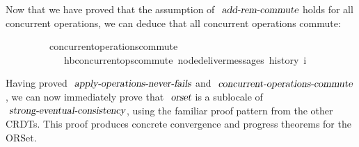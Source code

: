 \vspace{0.25em}
\noindent Now that we have proved that the assumption of $\isa{add-rem-commute}$ holds for all concurrent operations, we can deduce that all concurrent operations commute:
\vspace{0.25em}
\begin{isabellebody}
\ \ \ \ \ \ \ \ \ concurrent{\isacharunderscore}operations{\isacharunderscore}commute{\isacharcolon}\isanewline
\ \ \ \ \ \ \ \ \ \ \ \ {\isachardoublequoteopen}hb{\isachardot}concurrent{\isacharunderscore}ops{\isacharunderscore}commute\ {\isacharparenleft}node{\isacharunderscore}deliver{\isacharunderscore}messages\ {\isacharparenleft}history\ i{\isacharparenright}{\isacharparenright}{\isachardoublequoteclose}
\end{isabellebody}
\vspace{0.25em}

Having proved $\isa{apply-operations-never-fails}$ and $\isa{concurrent-operations-commute}$, we can now immediately prove that $\isa{orset}$ is a sublocale of $\isa{strong-eventual-consistency}$, using the familiar proof pattern from the other CRDTs.
This proof produces concrete convergence and progress theorems for the ORSet.
